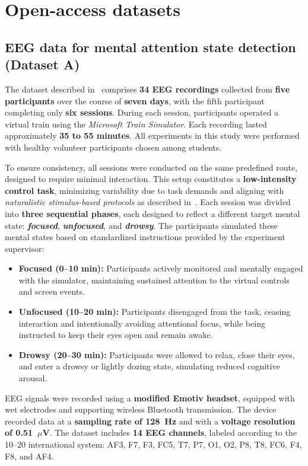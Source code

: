 \documentclass[10pt,letterpaper]{article}
\begin{document}
\section*{Open-access datasets}

\subsection*{EEG data for mental attention state detection (Dataset A)}

The dataset described in~\cite{aci2019attention} comprises \textbf{34 EEG recordings} collected from \textbf{five participants} over the course of \textbf{seven days}, with the fifth participant completing only \textbf{six sessions}. During each session, participants operated a virtual train using the \textit{Microsoft Train Simulator}. Each recording lasted approximately \textbf{35 to 55 minutes}. All experiments in this study were performed with healthy volunteer participants chosen among students.

To ensure consistency, all sessions were conducted on the same predefined route, designed to require minimal interaction. This setup constitutes a \textbf{low-intensity control task}, minimizing variability due to task demands and aligning with \textit{naturalistic stimulus-based protocols} as described in~\cite{chen2025hybrid}. Each session was divided into \textbf{three sequential phases}, each designed to reflect a different target mental state: \textbf{\textit{focused}}, \textbf{\textit{unfocused}}, and \textbf{\textit{drowsy}}. The participants simulated these mental states based on standardized instructions provided by the experiment supervisor:

\begin{itemize}
  \item \textbf{Focused (0--10 min):} Participants actively monitored and mentally engaged with the simulator, maintaining sustained attention to the virtual controls and screen events.
  \item \textbf{Unfocused (10--20 min):} Participants disengaged from the task, ceasing interaction and intentionally avoiding attentional focus, while being instructed to keep their eyes open and remain awake.
  \item \textbf{Drowsy (20--30 min):} Participants were allowed to relax, close their eyes, and enter a drowsy or lightly dozing state, simulating reduced cognitive arousal.
\end{itemize}

EEG signals were recorded using a \textbf{modified Emotiv headset}, equipped with wet electrodes and supporting wireless Bluetooth transmission. The device recorded data at a \textbf{sampling rate of 128~Hz} and with a \textbf{voltage resolution of 0.51~$\mu$V}. The dataset includes \textbf{14 EEG channels}, labeled according to the 10--20 international system: AF3, F7, F3, FC5, T7, P7, O1, O2, P8, T8, FC6, F4, F8, and AF4.
\end{document}
